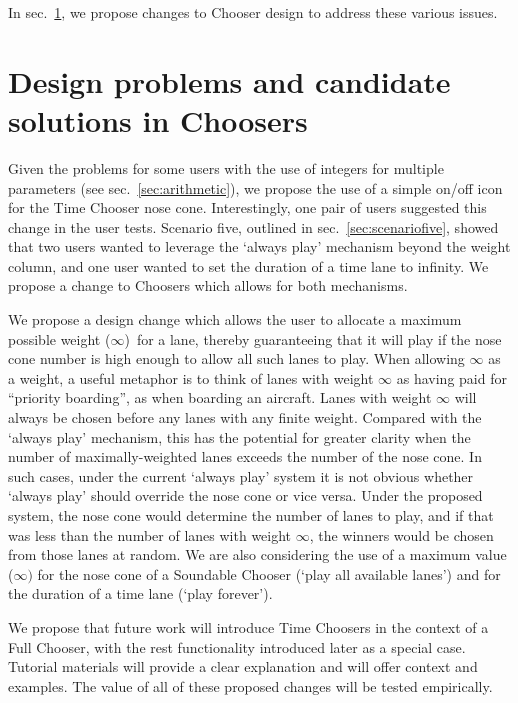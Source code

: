 \documentclass{ppig}
\begin{document}
In sec.~\ref{sec:solutions}, we propose changes to Chooser design to
address these various issues.

\hypertarget{sec:solutions}{%
\section{Design problems and candidate solutions in
Choosers}\label{sec:solutions}}

Given the problems for some users with the use of integers for multiple
parameters (see sec.~\ref{sec:arithmetic}), we propose the use of a
simple on/off icon for the Time Chooser nose cone. Interestingly, one
pair of users suggested this change in the user tests. Scenario five,
outlined in sec.~\ref{sec:scenariofive}, showed that two users wanted to
leverage the `always play' mechanism beyond the weight column, and one
user wanted to set the duration of a time lane to infinity. We propose a
change to Choosers which allows for both mechanisms.

We propose a design change which allows the user to allocate a maximum
possible weight (\(\infty\))~for a lane, thereby guaranteeing that it
will play if the nose cone number is high enough to allow all such lanes
to play. When allowing \(\infty\) as a weight, a useful metaphor is to
think of lanes with weight \(\infty\) as having paid for ``priority
boarding'', as when boarding an aircraft. Lanes with weight \(\infty\)
will always be chosen before any lanes with any finite weight. Compared
with the `always play' mechanism, this has the potential for greater
clarity when the number of maximally-weighted lanes exceeds the number
of the nose cone. In such cases, under the current `always play' system
it is not obvious whether `always play' should override the nose cone or
vice versa. Under the proposed system, the nose cone would determine the
number of lanes to play, and if that was less than the number of lanes
with weight \(\infty\), the winners would be chosen from those lanes at
random. We are also considering the use of a maximum value (\(\infty)\)
for the nose cone of a Soundable Chooser (`play all available lanes')
and for the duration of a time lane (`play forever').

We propose that future work will introduce Time Choosers in the context
of a Full Chooser, with the rest functionality introduced later as a
special case. Tutorial materials will provide a clear explanation and
will offer context and examples. The value of all of these proposed
changes will be tested empirically.
\end{document}
